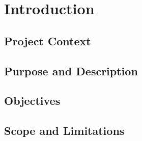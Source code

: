 \documentclass{article}
\author{Jonel C. Ganalon}
\date{19 March 2024}
\begin{document}
\section{Introduction}



\subsection{Project Context}






\subsection{Purpose and Description}



\subsection{Objectives}

\subsection{Scope and Limitations}
\end{document}
